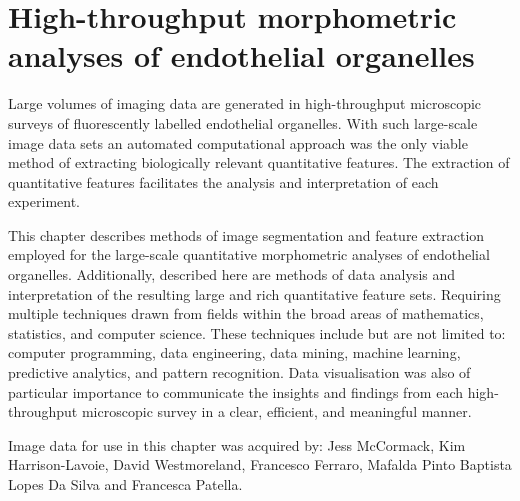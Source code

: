 \chapter{High-throughput morphometric analyses of endothelial organelles}
\label{endothelial_morphometry}
\ifpdf
	\graphicspath{{chapter_2/figs/}}
\fi


Large volumes of imaging data are generated in high-throughput microscopic surveys of fluorescently labelled endothelial organelles. With such large-scale image data sets an automated computational approach was the only viable method of extracting biologically relevant quantitative features. The extraction of quantitative features facilitates the analysis and interpretation of each experiment.

This chapter describes methods of image segmentation and feature extraction employed for the large-scale quantitative morphometric analyses of endothelial organelles. Additionally, described here are methods of data analysis and interpretation of the resulting large and rich quantitative feature sets. Requiring multiple techniques drawn from fields within the broad areas of mathematics, statistics, and computer science. These techniques include but are not limited to: computer programming, data engineering, data mining, machine learning, predictive analytics, and pattern recognition. Data visualisation was also of particular importance to communicate the insights and findings from each high-throughput microscopic survey in a clear, efficient, and meaningful manner.

Image data for use in this chapter was acquired by: Jess McCormack, Kim Harrison-Lavoie, David Westmoreland, Francesco Ferraro, Mafalda Pinto Baptista Lopes Da Silva and Francesca Patella.

